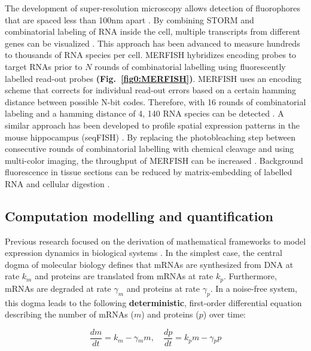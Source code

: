 The development of super-resolution microscopy allows detection of fluorophores that are spaced less than 100nm apart \citep{Sydor2015}. By combining \gls{STORM} and combinatorial labeling of RNA inside the cell, multiple transcripts from different genes can be visualized \citep{Lubeck2012}. This approach has been advanced to measure hundreds to thousands of RNA species per cell. \Gls{MERFISH} hybridizes encoding probes to target RNAs prior to $N$ rounds of combinatorial labelling using fluorescently labelled read-out probes \textbf{(Fig.~\ref{fig0:MERFISH})}. MERFISH uses an encoding scheme that corrects for individual read-out errors based on a certain hamming distance between possible N-bit codes. Therefore, with 16 rounds of combinatorial labeling and a hamming distance of 4, 140 RNA species can be detected \citep{Chen2015}. A similar approach has been developed to profile spatial expression patterns in the mouse hippocampus (seqFISH) \citep{Shah2016}. By replacing the photobleaching step between consecutive rounds of combinatorial labelling with chemical cleavage and using multi-color imaging, the throughput of MERFISH can be increased \citep{Moffitt2016a}. Background fluorescence in tissue sections can be reduced by matrix-embedding of labelled RNA and cellular digestion \citep{Moffitt2016}.

\subsection{Computation modelling and quantification}

Previous research focused on the derivation of mathematical frameworks to model expression dynamics in biological systems \citep{Tsimring2014}. In the simplest case, the central dogma of molecular biology defines that mRNAs are synthesized from DNA at rate $k_m$ and proteins are translated from mRNAs at rate $k_p$. Furthermore, mRNAs are degraded at rate $\gamma_m$ and proteins at rate $\gamma_p$. In a noise-free system, this dogma leads to the following \textbf{deterministic}, first-order differential equation describing the number of mRNAs ($m$) and proteins ($p$) over time:

\begin{equation}
\frac{dm}{dt}=k_m-\gamma{}_mm,\quad \frac{dp}{dt}=k_pm-\gamma{}_pp
\end{equation}

